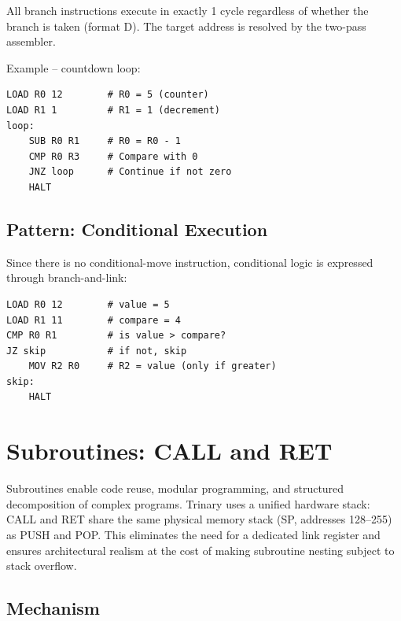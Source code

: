 \documentclass[12pt,a4paper,twoside]{book}
\theoremstyle{trinarytheorem}
\theoremstyle{trinarydefinition}
\begin{document}
All branch instructions execute in exactly 1 cycle regardless of whether the branch
is taken (format D). The target address is resolved by the two-pass assembler.

Example -- countdown loop:
\begin{lstlisting}
LOAD R0 12        # R0 = 5 (counter)
LOAD R1 1         # R1 = 1 (decrement)
loop:
    SUB R0 R1     # R0 = R0 - 1
    CMP R0 R3     # Compare with 0
    JNZ loop      # Continue if not zero
    HALT
\end{lstlisting}

\section{Pattern: Conditional Execution}

Since there is no conditional-move instruction, conditional logic is expressed
through branch-and-link:
\begin{lstlisting}
LOAD R0 12        # value = 5
LOAD R1 11        # compare = 4
CMP R0 R1         # is value > compare?
JZ skip           # if not, skip
    MOV R2 R0     # R2 = value (only if greater)
skip:
    HALT
\end{lstlisting}

\chapter{Subroutines: CALL and RET}
\label{ch:subroutines}

Subroutines enable code reuse, modular programming, and structured decomposition of
complex programs. Trinary uses a unified hardware stack: CALL and RET share the same
physical memory stack (SP, addresses 128--255) as PUSH and POP. This eliminates the
need for a dedicated link register and ensures architectural realism at the cost of
making subroutine nesting subject to stack overflow.

\section{Mechanism}
\end{document}
